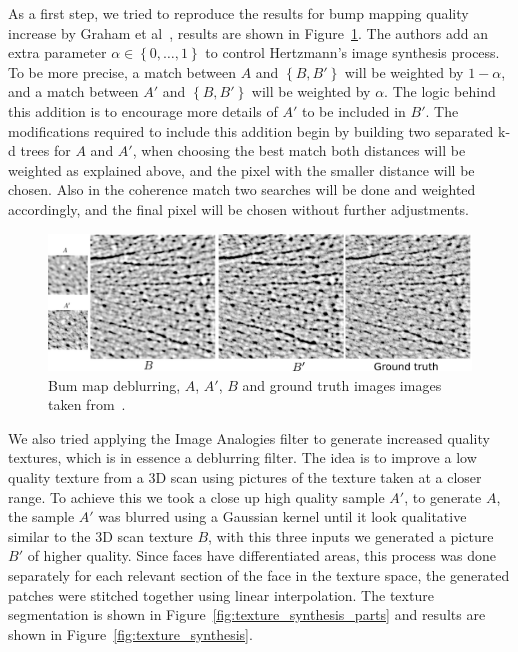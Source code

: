 As a first step, we tried to reproduce the results for bump mapping quality increase by Graham et al~\cite{Graham2013}, results are shown in Figure~\ref{fig:bump_maps}.
The authors add an extra parameter $\alpha \in \left\lbrace 0, \ldots, 1 \right\rbrace$ to control Hertzmann's image synthesis process.
To be more precise, a match between $A$ and $\left\lbrace B,B' \right\rbrace$ will be weighted by $1 - \alpha$, and a match between $A'$ and $\left\lbrace B,B' \right\rbrace$ will be weighted by $\alpha$.
The logic behind this addition is to encourage more details of $A'$ to be included in $B'$.
The modifications required to include this addition begin by building two separated k-d trees for $A$ and $A'$, when choosing the best match both distances will be weighted as explained above, and the pixel with the smaller distance will be chosen.
Also in the coherence match two searches will be done and weighted accordingly, and the final pixel will be chosen without further adjustments.

\begin{figure}[htbp!]
\centering
\includegraphics[width=\textwidth]{img/bump_maps}
	\caption{ Bum map deblurring, $A$, $A'$, $B$ and ground truth images images taken from~\cite{Graham2013}.}
	\label{fig:bump_maps}
\end{figure}

We also tried applying the Image Analogies filter to generate increased quality textures, which is in essence a deblurring filter.
The idea is to improve a low quality texture from a 3D scan using pictures of the texture taken at a closer range.
To achieve this we took a close up high quality sample $A'$, to generate $A$, the sample $A'$ was blurred using a Gaussian kernel until it look qualitative similar to the 3D scan texture $B$, with this three inputs we generated a picture $B'$ of higher quality.
Since faces have differentiated areas, this process was done separately for each relevant section of the face in the texture space, the generated patches were stitched together using linear interpolation.
The texture segmentation is shown in Figure~\ref{fig:texture_synthesis_parts} and results are shown in Figure~\ref{fig:texture_synthesis}.

